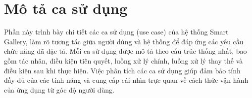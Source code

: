 \section{Mô tả ca sử dụng}

Phần này trình bày chi tiết các ca sử dụng (use case) của hệ thống Smart Gallery, làm rõ tương tác giữa người dùng và hệ thống để đáp ứng các yêu cầu chức năng đã đặc tả. Mỗi ca sử dụng được mô tả theo cấu trúc thống nhất, bao gồm tác nhân, điều kiện tiên quyết, luồng xử lý chính, luồng xử lý thay thế và điều kiện sau khi thực hiện. Việc phân tích các ca sử dụng giúp đảm bảo tính đầy đủ của các tính năng và cung cấp cái nhìn trực quan về cách thức vận hành của ứng dụng từ góc độ người dùng.



\nopagebreak

\nopagebreak

\nopagebreak

\nopagebreak

\nopagebreak

\nopagebreak

\nopagebreak

\nopagebreak

\nopagebreak

\nopagebreak

\nopagebreak

\nopagebreak

\nopagebreak

\nopagebreak

\nopagebreak

\nopagebreak
\nopagebreak